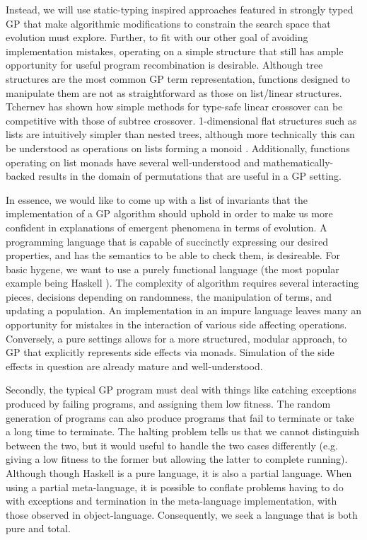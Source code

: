 \documentclass{acm_proc_article-sp}
\begin{document}
Instead, we will use static-typing inspired approaches featured in
strongly typed GP \cite{montana:strongtree, tchernev:forthcross} that make algorithmic
modifications to constrain the search space that evolution must
explore. Further, to fit with our other goal of avoiding
implementation mistakes, operating on a simple structure that still
has ample opportunity for useful program recombination is
desirable. Although tree structures are the most common GP term
representation, functions designed to manipulate them are not as
straightforward as those on list/linear structures. Tchernev
\cite{tchernev:forthcross, tchernev:crossmethods} has shown how simple
methods for type-safe linear crossover can be competitive with those
of subtree crossover. 1-dimensional flat structures such as lists are
intuitively simpler than nested trees, although more technically this
can be understood as operations on lists forming a monoid
\cite{spivey:catlists}. Additionally, functions operating on list monads have
several well-understood and mathematically-backed results in the
domain of permutations that are useful in a GP setting.

In essence, we would like to come up with a list of invariants that
the implementation of a GP algorithm should uphold in order to make us
more confident in explanations of emergent phenomena in terms of
evolution. A programming language that is capable of succinctly
expressing our desired properties, and has the semantics to be able to
check them, is desireable. For basic hygene, we want to use a purely
functional language (the most popular example being Haskell
\cite{spj:haskell}). The complexity of algorithm requires several
interacting pieces, decisions depending on randomness, the
manipulation of terms, and updating a population. An implementation in
an impure language leaves many an opportunity for mistakes in the
interaction of various side affecting operations. Conversely, a pure
settings allows for a more structured, modular approach, to GP that
explicitly represents side effects via monads. Simulation of the side
effects in question are already mature and well-understood.

Secondly, the typical GP program must deal with things like catching
exceptions produced by failing programs, and assigning them low
fitness. The random generation of programs can also produce programs
that fail to terminate or take a long time to terminate. The halting
problem tells us that we cannot distinguish between the
two, but it would useful to handle the two cases differently
(e.g. giving a low fitness to the former but allowing the latter to
complete running). Although though Haskell is a pure language, it is
also a partial language. When using a partial meta-language, it is
possible to conflate problems having to do with exceptions and
termination in the meta-language implementation, with those observed
in object-language. Consequently, we seek a language that is both pure
and total.
\end{document}
